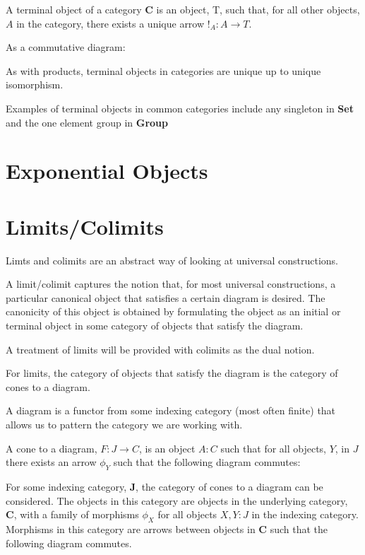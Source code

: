\documentclass[a4paper,12pt]{article}
\begin{document}
A terminal object of a category \textbf{C} is an object, T, such that, for all
other objects, $A$ in the category, there exists a unique arrow $!_{A}: A
\rightarrow T$.

As a commutative diagram:


As with products, terminal objects in categories are unique up to unique
isomorphism.

Examples of terminal objects in common categories include any singleton in
\textbf{Set} and the one element group in \textbf{Group}

\section{Exponential Objects}
\section{Limits/Colimits}
Limts and colimits are an abstract way of looking at universal constructions.

A limit/colimit captures the notion that, for most universal constructions, a
particular canonical object that satisfies a certain diagram is desired. The
canonicity of this object is obtained by formulating the object as an initial
or terminal object in some category of objects that satisfy the diagram.

A treatment of limits will be provided with colimits as the dual notion.

For limits, the category of objects that satisfy the diagram is the category of
cones to a diagram.

A diagram is a functor from some indexing category (most often finite) that allows
us to pattern the category we are working with.

A cone to a diagram, $F: J \rightarrow C$, is an object $A: C$ such that for
all objects, $Y$, in $J$ there exists an arrow $\phi_{Y}$ such that the
following diagram commutes:


For some indexing category, \textbf{J}, the category of cones to a diagram can be
considered. The objects in this category are objects in the underlying category,
\textbf{C}, with a family of morphisms $\phi_{X}$ for all objects $X, Y: J$ in the indexing
category. Morphisms in this category are arrows between objects in \textbf{C}
such that the following diagram commutes.
\end{document}
